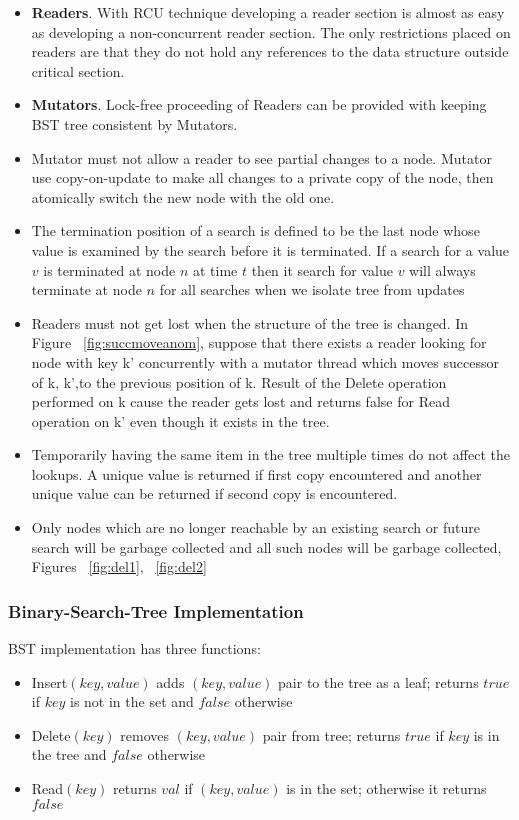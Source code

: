 \begin{itemize} 
\item \textsf{\textbf{Readers}}. With RCU technique developing a reader section is almost as easy as developing a non-concurrent reader section.  The only restrictions placed on readers are that they do not hold any references to the data structure outside critical section.
\item \textsf{\textbf{Mutators}}. Lock-free proceeding of \textsf{Readers} can be provided with keeping BST tree consistent by \textsf{Mutators}. 
\item Mutator must not allow a reader to see partial changes to a node. Mutator use copy-on-update to make all changes to a private copy of the node, then atomically switch the new node with the old one.
\item The termination position of a search is defined to be the last node whose value is examined by the search before it is terminated. If a search for a value $v$ is terminated at node $n$ at  time $t$ then it search for value $v$ will always terminate at node $n$ for all searches when we isolate tree from updates
\item Readers must not get lost when the structure of the tree is changed. In Figure ~\ref{fig:succmoveanom}, suppose that there exists a reader looking for node with key \textsf{k'} concurrently with a mutator thread which moves successor of \textsf{k}, \textsf{k'},to the previous position of \textsf{k}. Result of the \textsf{Delete} operation performed on \textsf{k} cause the reader gets lost and returns false for \textsf{Read} operation on \textsf{k'} even though it exists in the tree.
\item  Temporarily having the same item in the tree multiple times do not affect the lookups. A unique value is returned if first copy encountered and another unique value can be returned if second copy is encountered.
\item Only nodes which are  no longer reachable  by an existing search or  future search will be garbage collected and all such nodes will be garbage collected, Figures ~\ref{fig:del1}, ~\ref{fig:del2}
\end{itemize}
\subsubsection{Binary-Search-Tree Implementation}
\textsf{BST} implementation has three functions:
\begin{itemize}
\item \textsf{Insert}$(key,value)$ adds $(key,value)$ pair to the tree as a leaf; returns $true$ if $key$ is not in the set and $false$ otherwise
\item \textsf{Delete}$(key)$ removes $(key,value)$ pair  from tree; returns $true$ if $key$ is in the tree and $false$ otherwise
\item \textsf{Read}$(key)$ returns $val$ if $(key,value)$ is in the set; otherwise it returns $false$
\end{itemize}
